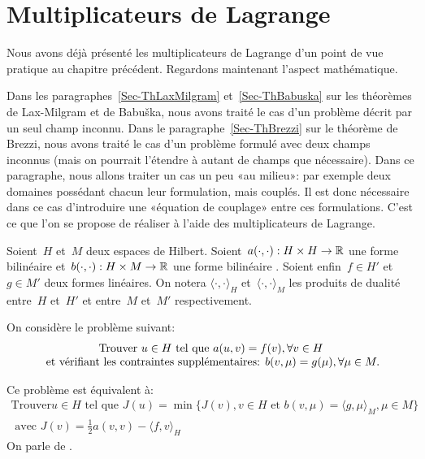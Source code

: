 \medskip



\section{Multiplicateurs de Lagrange}\label{Sec-MultLag}
Nous avons déjà présenté les multiplicateurs de Lagrange d'un point de
vue pratique au chapitre précédent.
Regardons maintenant l'aspect mathématique.

Dans les paragraphes~\ref{Sec-ThLaxMilgram} et~\ref{Sec-ThBabuska} sur les théorèmes de Lax-Milgram et
de Babuška, nous avons traité le cas d'un problème décrit par un seul champ inconnu.
Dans le paragraphe~\ref{Sec-ThBrezzi} sur le théorème de Brezzi, nous avons traité le cas d'un problème formulé
avec deux champs inconnus (mais on pourrait l'étendre à autant de champs
que nécessaire).
Dans ce paragraphe, nous allons traiter un cas un peu «au milieu»: par exemple
deux domaines possédant chacun leur formulation, mais couplés. Il est donc
nécessaire dans ce cas d'introduire une «équation de couplage» entre ces
formulations. C'est ce que l'on se propose de réaliser à l'aide des multiplicateurs
de Lagrange.

\medskip
\begin{definition}
Soient~$H$ et~$M$ deux espaces de Hilbert.
Soient~$a(\cdot,\cdot): H\times H\rightarrow\mathbb R$ une forme bilinéaire 
et~$b(\cdot,\cdot): H\times M\rightarrow\mathbb R$ une forme bilinéaire .
Soient enfin~$f\in H'$ et~$g\in M'$ deux formes linéaires. On notera
$\langle\cdot,\cdot\rangle_H$ et~$\langle\cdot,\cdot\rangle_M$ les produits de dualité entre~$H$ et~$H'$
et entre~$M$ et~$M'$ respectivement.

\medskip
On considère le problème suivant:
\begin{equation}
\begin{array}{c}
\text{Trouver } u\in H \text{ tel que } a(u,v)=f(v), \forall v\in H \\
\text{ et vérifiant les
contraintes supplémentaires: } b(v,\mu)=g(\mu), \forall \mu\in M.
\end{array}
\end{equation}

\medskip
Ce problème est équivalent à:
\begin{equation}\label{Eq-Pmin}
\begin{array}{c}
\text{Trouver} u\in H \text{ tel que }
J(u)=\min\{J(v), v\in H \text{ et } b(v,\mu)=\langle g,\mu\rangle_M, \mu\in M\} \\[+3mm]
\text{ avec }
J(v)=\frac12 a(v,v)-\langle f,v\rangle_H
\end{array}
\end{equation}
On parle de .
\end{definition}

